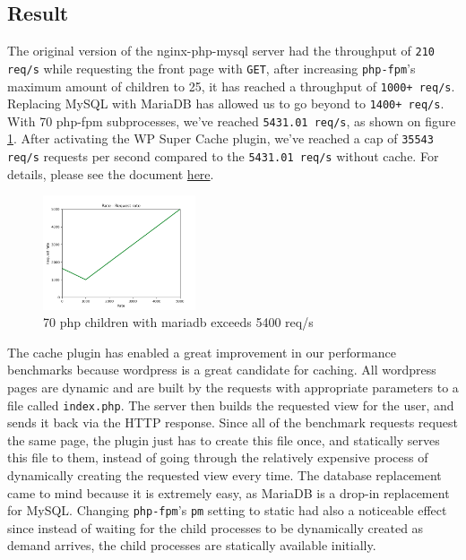 \subsection{Result}

The original version of the nginx-php-mysql server had the throughput of \texttt{210 req/s} while requesting the front page with \texttt{GET}, after increasing \texttt{php-fpm}'s maximum amount of children to 25, it has reached a throughput of \texttt{1000+ req/s}. Replacing MySQL with MariaDB has allowed us to go beyond to \texttt{1400+ req/s}. With 70 php-fpm subprocesses, we've reached \texttt{5431.01 req/s}, as shown on figure \ref{bm_70}.
After activating the WP Super Cache plugin, we've reached a cap of \texttt{35543 req/s} requests per second compared to the \texttt{5431.01 req/s} without cache. For details, please see the document \href{https://github.com/danbachar/swiss-knife/blob/master/task1/benchmark/optimization.md}{here}. 

\begin{figure} [htb]
\centering 
\includegraphics[width=0.4\textwidth]{benchmark/res/bm_70.png}
\caption{70 php children with mariadb exceeds 5400 req/s}
\label{bm_70}
\end{figure}

\newline
The cache plugin has enabled a great improvement in our performance benchmarks because wordpress is a great candidate for caching. All wordpress pages are dynamic and are built by the requests with appropriate parameters to a file called \texttt{index.php}. The server then builds the requested view for the user, and sends it back via the HTTP response. Since all of the benchmark requests request the same page, the plugin just has to create this file once, and statically serves this file to them, instead of going through the relatively expensive process of dynamically creating the requested view every time.
\newline
The database replacement came to mind because it is extremely easy, as MariaDB is a drop-in replacement for MySQL. 
\newline
Changing \texttt{php-fpm}'s \texttt{pm} setting to static had also a noticeable effect since instead of waiting for the child processes to be dynamically created as demand arrives, the child processes are statically available initially. 

